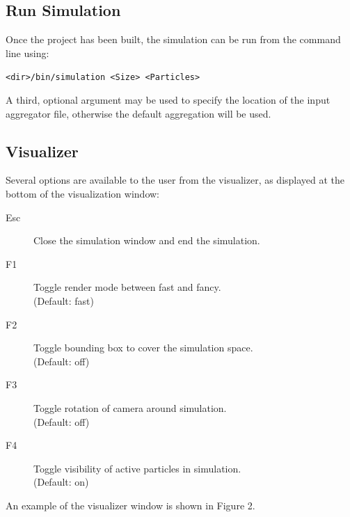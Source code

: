 \documentclass[fleqn,10pt]{SelfArx} %
\begin{document}
\subsection{Run Simulation}
Once the project has been built, the simulation can be run from the command line using:
\begin{center}
    \texttt{<dir>/bin/simulation <Size> <Particles>}
\end{center}
A third, optional argument may be used to specify the location of the input aggregator file, otherwise the default aggregation will be used.
\subsection{Visualizer}
Several options are available to the user from the visualizer, as displayed at the bottom of the visualization window:
\begin{description}
    \item[Esc] Close the simulation window and end the simulation.
    \item[F1] Toggle render mode between fast and fancy.\\ (Default: fast)
    \item[F2] Toggle bounding box to cover the simulation space.\\ (Default: off)
    \item[F3] Toggle rotation of camera around simulation.\\ (Default: off)
    \item[F4] Toggle visibility of active particles in simulation.\\ (Default: on)
\end{description}
An example of the visualizer window is shown in Figure 2.
\end{document}
